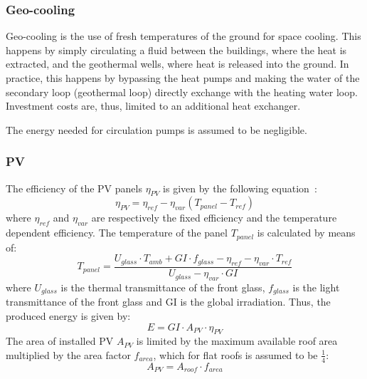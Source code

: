 \documentclass{article}
\begin{document}
\subsubsection{Geo-cooling}
Geo-cooling is the use of fresh temperatures of the ground for space cooling. This happens by simply circulating a fluid between the buildings, where the heat is extracted, and the geothermal wells, where heat is released into the ground. In practice, this happens by bypassing the heat pumps and making the water of the secondary loop (geothermal loop) directly exchange with the heating water loop. Investment costs are, thus, limited to an additional heat exchanger. 

The energy needed for circulation pumps is assumed to be negligible. 


\subsubsection{PV}
The efficiency of the PV panels $\eta_{PV}$ is given by the following equation~\cite{stadlerModelbasedOptimizationDistributed2016}:
\begin{equation}
	\eta_{PV} = \eta_{ref} - \eta_{var} (T_{panel}-T_{ref})
\end{equation}
where $\eta_{ref}$ and $\eta_{var}$ are respectively the fixed efficiency and the temperature dependent efficiency. The temperature of the panel $T_{panel}$ is calculated by means of:
\begin{equation}
	T_{panel} = \frac{U_{glass}\cdot T_{amb} + GI \cdot f_{glass}-\eta_{ref} - \eta_{var} \cdot T_{ref}}{U_{glass}-\eta_{var} \cdot GI}
\end{equation}
where $U_{glass}$ is the thermal transmittance of the front glass, $f_{glass}$ is the light transmittance of the front glass and GI is the global irradiation.
Thus, the produced energy is given by:
\begin{equation}
	E = GI \cdot A_{PV} \cdot  \eta_{PV}
\end{equation}
The area of installed PV $A_{PV}$ is limited by the maximum available roof area multiplied by the area factor $f_{area}$, which for flat roofs is assumed to be $\frac{1}{4}$:
\begin{equation}
	A_{PV} = A_{roof} \cdot f_{area}
\end{equation}
\end{document}
